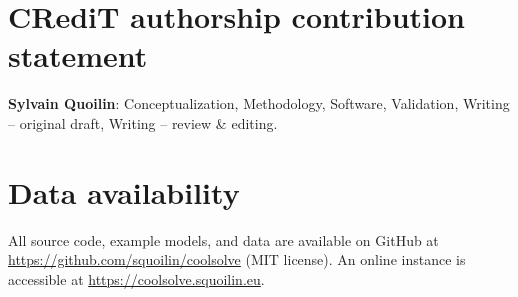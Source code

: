 \documentclass[review,3p]{elsarticle}
\begin{document}
\section*{CRediT authorship contribution statement}
\textbf{Sylvain Quoilin}: Conceptualization, Methodology, Software, Validation, Writing -- original draft, Writing -- review \& editing.

\section*{Data availability}
All source code, example models, and data are available on GitHub at \url{https://github.com/squoilin/coolsolve} (MIT license). An online instance is accessible at \url{https://coolsolve.squoilin.eu}.



\end{document}
